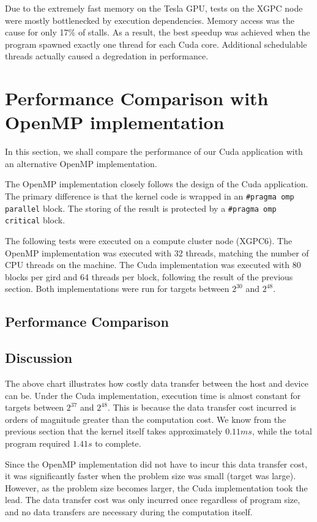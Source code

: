 \documentclass[a4paper,12pt]{article}
\begin{document}
Due to the extremely fast memory on the Tesla GPU, tests on the XGPC node were mostly bottlenecked by execution dependencies. Memory access was the cause for only 17\% of stalls. As a result, the best speedup was achieved when the program spawned exactly one thread for each Cuda core. Additional schedulable threads actually caused a degredation in performance.

\section{Performance Comparison with OpenMP implementation}

In this section, we shall compare the performance of our Cuda application with an alternative OpenMP implementation.

The OpenMP implementation closely follows the design of the Cuda application. The primary difference is that the kernel code is wrapped in an \texttt{#pragma omp parallel} block. The storing of the result is protected by a \texttt{#pragma omp critical} block.

The following tests were executed on a compute cluster node (XGPC6). The OpenMP implementation was executed with 32 threads, matching the number of CPU threads on the machine. The Cuda implementation was executed with 80 blocks per gird and 64 threads per block, following the result of the previous section. Both implementations were run for targets between $2^{30}$ and $2^{48}$.

\subsection{Performance Comparison}

\subsection{Discussion}

The above chart illustrates how costly data transfer between the host and device can be. Under the Cuda implementation, execution time is almost constant for targets between $2^{37}$ and $2^{48}$. This is because the data transfer cost incurred is orders of magnitude greater than the computation cost. We know from the previous section that the kernel itself takes approximately $0.11 ms$, while the total program required $1.41 s$ to complete.

Since the OpenMP implementation did not have to incur this data transfer cost, it was significantly faster when the problem size was small (target was large). However, as the problem size becomes larger, the Cuda implementation took the lead. The data transfer cost was only incurred once regardless of program size, and no data transfers are necessary during the computation itself.

\newpage
\end{document}
